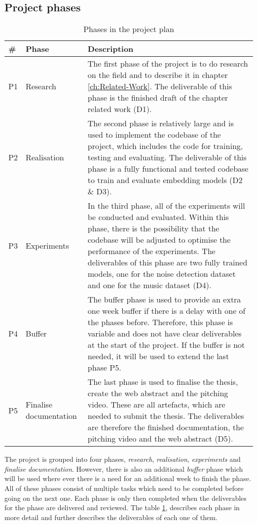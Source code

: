 \subsection{Project phases}
\label{sec:Project-Phases}
\begin{table}[htb]
    \centering
    \caption{Phases in the project plan}
	\label{tab:Phases}
    \begin{tabular}{p{} | p{} | p{}}
        \toprule
        \textbf{\#} & \textbf{Phase} & \textbf{Description} \\ 
        \midrule[1pt]
        P1 & Research & The first phase of the project is to do research on the field and to describe it in chapter \ref{ch:Related-Work}. The deliverable of this phase is the finished draft of the chapter related work (D1). \\
        \hline
        P2 & Realisation & The second phase is relatively large and is used to implement the codebase of the project, which includes the code for training, testing and evaluating. The deliverable of this phase is a fully functional and tested codebase to train and evaluate embedding models (D2 \& D3).\\
        \hline
        P3 & Experiments & In the third phase, all of the experiments will be conducted and evaluated. Within this phase, there is the possibility that the codebase will be adjusted to optimise the performance of the experiments. The deliverables of this phase are two fully trained models, one for the noise detection dataset and one for the music dataset (D4).\\
        \hline
        P4 & Buffer & The buffer phase is used to provide an extra one week buffer if there is a  delay with one of the phases before. Therefore, this phase is variable and does not have clear deliverables at the start of the project. If the buffer is not needed, it will be used to extend the last phase P5. \\
        \hline
        P5 & Finalise documentation & The last phase is used to finalise the thesis, create the web abstract and the pitching video. These are all artefacts, which are needed to submit the thesis. The deliverables are therefore the finished documentation, the pitching video and the web abstract (D5). \\
        \bottomrule
    \end{tabular}
\end{table}
\noindent
The project is grouped into four phases, \textit{research}, \textit{realisation}, \textit{experiments} and \textit{finalise documentation}. However, there is also an additional \textit{buffer} phase which will be used where ever there is a need for an additional week to finish the phase. All of these phases consist of multiple tasks which need to be completed before going on the next one. Each phase is only then completed when the deliverables for the phase are delivered and reviewed. The table \ref{tab:Phases}, describes each phase in more detail and further describes the deliverables of each one of them.


